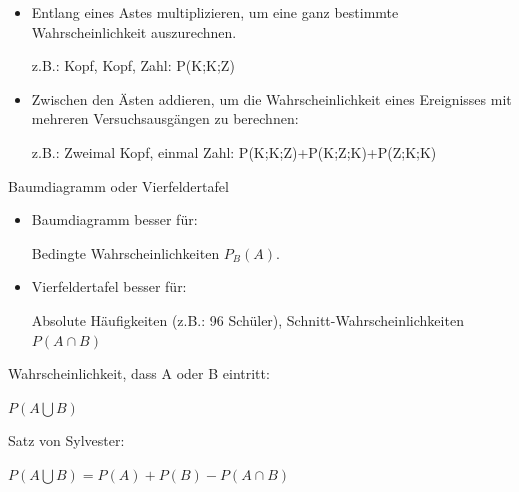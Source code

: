 \documentclass[paper=a6,landscape,ngerman,twoside=true,fontsize=12pt]{scrartcl}
\begin{document}
\begin{antwort}
	\normalsize\begin{itemize}
		\item Entlang eines Astes multiplizieren, um eine ganz bestimmte Wahrscheinlichkeit auszurechnen.
				
		z.B.: Kopf, Kopf, Zahl: P(K;K;Z)
		\item Zwischen den Ästen addieren, um die Wahrscheinlichkeit eines Ereignisses mit mehreren Versuchsausgängen zu berechnen:
		
		z.B.: Zweimal Kopf, einmal Zahl: P(K;K;Z)+P(K;Z;K)+P(Z;K;K)
	\end{itemize}
\end{antwort}
\begin{frage}
	Baumdiagramm oder Vierfeldertafel
\end{frage}
\begin{antwort}
	\begin{itemize}
		\item Baumdiagramm besser für:
		
		Bedingte Wahrscheinlichkeiten $P_B(A)$.
		
		\item Vierfeldertafel besser für:
		
		Absolute Häufigkeiten (z.B.: 96 Schüler), Schnitt-Wahrscheinlichkeiten $P(A\cap B)$
	\end{itemize}
\end{antwort}
\begin{frage}
	Wahrscheinlichkeit, dass A oder B eintritt: 
	
	$P(A\bigcup B)$
\end{frage}
\begin{antwort}
	Satz von Sylvester:
	
	$P(A\bigcup B)=P(A)+P(B)- P(A\cap B)$
	\bigskip
	
\end{antwort}
\end{document}

